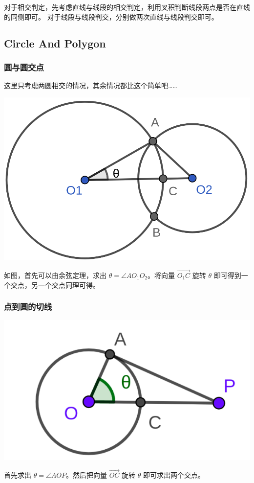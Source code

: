 \documentclass[10pt]{beamer}
\begin{document}
\begin{CJK}{UTF8}{gkai}
\begin{spacing}{1.2}
\begin{frame}
			对于相交判定，先考虑直线与线段的相交判定，利用叉积判断线段两点是否在直线的同侧即可。 \pause 对于线段与线段判交，分别做两次直线与线段判交即可。

		\end{frame}
		\subsection{Circle And Polygon}
		\begin{frame}
			\frametitle{圆与圆交点}
			这里只考虑两圆相交的情况，其余情况都比这个简单吧…… \pause
			\begin{center}
			\includegraphics[scale=0.14]{../Pictures/Circle_Intersection.png}
			\end{center}
			如图，首先可以由余弦定理，求出 $\theta = \angle AO_1O_2$。将向量 $\overrightarrow{O_1C}$ 旋转 $\theta$ 即可得到一个交点，另一个交点同理可得。

		\end{frame}
		\begin{frame}
			\frametitle{点到圆的切线}
			\begin{center}
			\includegraphics[scale=0.14]{../Pictures/Tangent_Line_Through_Point.png}
			\end{center}
			首先求出 $\theta = \angle AOP$。然后把向量 $\overrightarrow{OC}$ 旋转 $\theta$ 即可求出两个交点。


\end{frame}
\end{spacing}
\end{CJK}
\end{document}
